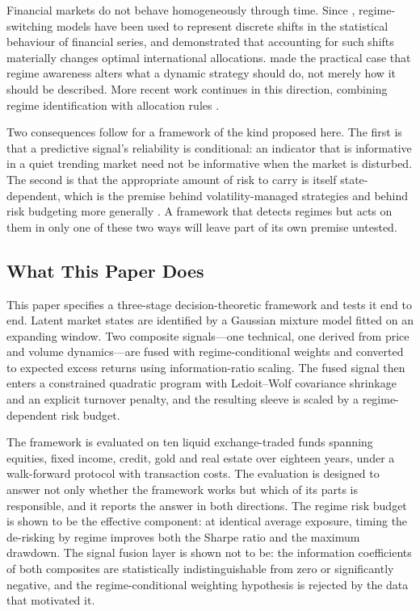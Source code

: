 Financial markets do not behave homogeneously through time. Since \citet{hamilton89},
regime-switching models have been used to represent discrete shifts in the statistical
behaviour of financial series, and \citet{angbekaert02} demonstrated that accounting for
such shifts materially changes optimal international allocations. \citet{kritzman12}
made the practical case that regime awareness alters what a dynamic strategy should do,
not merely how it should be described. More recent work continues in this direction,
combining regime identification with allocation rules \citep{li25, luo26}.

Two consequences follow for a framework of the kind proposed here. The first is that a
predictive signal's reliability is conditional: an indicator that is informative in a
quiet trending market need not be informative when the market is disturbed. The second
is that the appropriate amount of risk to carry is itself state-dependent, which is the
premise behind volatility-managed strategies \citep{moreira17, hood25} and behind risk
budgeting more generally \citep{asimit25}. A framework that detects regimes but acts on
them in only one of these two ways will leave part of its own premise untested.

\subsection{What This Paper Does}

This paper specifies a three-stage decision-theoretic framework and tests it end to
end. Latent market states are identified by a Gaussian mixture model fitted on an
expanding window. Two composite signals---one technical, one derived from price and
volume dynamics---are fused with regime-conditional weights and converted to expected
excess returns using information-ratio scaling. The fused signal then enters a
constrained quadratic program with Ledoit--Wolf covariance shrinkage
\citep{ledoit04} and an explicit turnover penalty, and the resulting sleeve is scaled by
a regime-dependent risk budget.

The framework is evaluated on ten liquid exchange-traded funds spanning equities, fixed
income, credit, gold and real estate over eighteen years, under a walk-forward protocol
with transaction costs. The evaluation is designed to answer not only whether the
framework works but which of its parts is responsible, and it reports the answer in
both directions. The regime risk budget is shown to be the effective component: at
identical average exposure, timing the de-risking by regime improves both the Sharpe
ratio and the maximum drawdown. The signal fusion layer is shown not to be: the
information coefficients of both composites are statistically indistinguishable from
zero or significantly negative, and the regime-conditional weighting hypothesis is
rejected by the data that motivated it.

